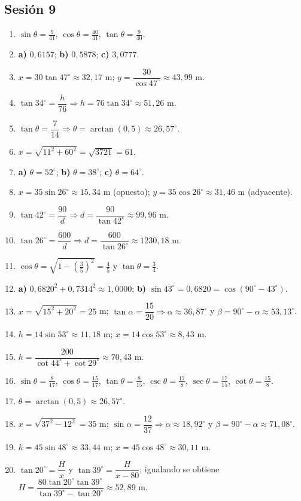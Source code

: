\documentclass[12pt, letterpaper]{article}
\providecommand{\sen}{\sin}
\begin{document}
\subsection*{Sesión 9}
\begin{enumerate}[leftmargin=*, label=\textbf{\arabic*.}]
  \item $\sen\theta=\frac{9}{41}$, $\cos\theta=\frac{40}{41}$, $\tan\theta=\frac{9}{40}$.
  \item \textbf{a)} $0{,}6157$; \quad \textbf{b)} $0{,}5878$; \quad \textbf{c)} $3{,}0777$.
  \item $x=30\tan 47^{\circ}\approx 32{,}17$ m; $y=\dfrac{30}{\cos 47^{\circ}}\approx 43{,}99$ m.
  \item $\tan 34^{\circ}=\dfrac{h}{76}\Rightarrow h=76\tan 34^{\circ}\approx 51{,}26$ m.
  \item $\tan\theta=\dfrac{7}{14}\Rightarrow\theta=\arctan\left(0{,}5\right)\approx 26{,}57^{\circ}$.
  \item $x=\sqrt{11^2+60^2}=\sqrt{3721}=61$.
  \item \textbf{a)} $\theta=52^{\circ}$; \quad \textbf{b)} $\theta=38^{\circ}$; \quad \textbf{c)} $\theta=64^{\circ}$.
  \item $x=35\sen 26^{\circ}\approx 15{,}34$ m (opuesto); $y=35\cos 26^{\circ}\approx 31{,}46$ m (adyacente).
  \item $\tan 42^{\circ}=\dfrac{90}{d}\Rightarrow d=\dfrac{90}{\tan 42^{\circ}}\approx 99{,}96$ m.
  \item $\tan 26^{\circ}=\dfrac{600}{d}\Rightarrow d=\dfrac{600}{\tan 26^{\circ}}\approx 1230{,}18$ m.
  \item $\cos\theta=\sqrt{1-\left(\frac{3}{5}\right)^2}=\frac{4}{5}$ y $\tan\theta=\frac{3}{4}$.
  \item \textbf{a)} $0{,}6820^2+0{,}7314^2\approx 1{,}0000$; \quad \textbf{b)} $\sen 43^{\circ}=0{,}6820=\cos(90^{\circ}-43^{\circ})$. \checkmark
  \item $x=\sqrt{15^2+20^2}=25$ m; $\tan\alpha=\dfrac{15}{20}\Rightarrow\alpha\approx 36{,}87^{\circ}$ y $\beta=90^{\circ}-\alpha\approx 53{,}13^{\circ}$.
  \item $h=14\sen 53^{\circ}\approx 11{,}18$ m; $x=14\cos 53^{\circ}\approx 8{,}43$ m.
  \item $h=\dfrac{200}{\cot 44^{\circ}+\cot 29^{\circ}}\approx 70{,}43$ m.
  \item $\sen\theta=\frac{8}{17}$, $\cos\theta=\frac{15}{17}$, $\tan\theta=\frac{8}{15}$, $\csc\theta=\frac{17}{8}$, $\sec\theta=\frac{17}{15}$, $\cot\theta=\frac{15}{8}$.
  \item $\theta=\arctan\left(0{,}5\right)\approx 26{,}57^{\circ}$.
  \item $x=\sqrt{37^2-12^2}=35$ m; $\sen\alpha=\dfrac{12}{37}\Rightarrow\alpha\approx 18{,}92^{\circ}$ y $\beta=90^{\circ}-\alpha\approx 71{,}08^{\circ}$.
  \item $h=45\sen 48^{\circ}\approx 33{,}44$ m; $x=45\cos 48^{\circ}\approx 30{,}11$ m.
  \item $\tan 20^{\circ}=\dfrac{H}{x}$ y $\tan 39^{\circ}=\dfrac{H}{x-80}$; igualando se obtiene $H=\dfrac{80\tan 20^{\circ}\tan 39^{\circ}}{\tan 39^{\circ}-\tan 20^{\circ}}\approx 52{,}89$ m.
\end{enumerate}
\end{document}

